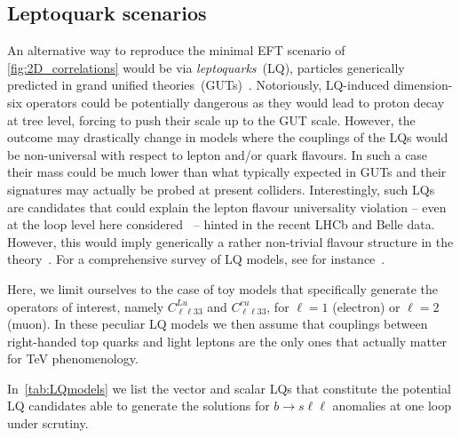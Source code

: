 \subsection{Leptoquark scenarios}
\label{sec:mod_Leptoquarks}
An alternative way to reproduce the minimal EFT scenario of \autoref{fig:2D_correlations} would be via \emph{leptoquarks}~(LQ), particles generically predicted in grand unified  theories~(GUTs)~\cite{Pati:1974yy,PhysRevLett.32.438}.
Notoriously, LQ-induced dimension-six operators could be potentially dangerous as they would lead to proton decay at tree level, forcing to push their scale up to the GUT scale. However, the outcome may drastically change in models where the couplings of the LQs would be non-universal with respect to lepton and/or quark flavours. In such a case their mass could be much lower than what typically expected in GUTs and their signatures may actually be probed at present colliders. Interestingly, such LQs are candidates that could explain the lepton flavour universality violation -- even at the loop level here considered~\cite{Camargo-Molina:2018cwu,Coy:2019rfr} -- hinted in the recent LHCb and Belle data. However, this would imply generically a rather non-trivial flavour structure in the theory~\cite{Becirevic:2017jtw}. For a comprehensive survey of LQ models, see for instance~\cite{Buchmuller:1986zs,delAguila:2010mx,Alonso:2015sja,Dorsner:2016wpm,deBlas:2017xtg}. 

Here, we limit ourselves to the case of toy models that specifically generate the operators of interest, namely $C^{Lu}_{\ell \ell33}$ and $C^{eu}_{\ell \ell33} $, for $ \ell=1$ (electron)  or $ \ell=2$ (muon). In these peculiar LQ models we then assume that couplings between right-handed top quarks and light leptons are the only ones that actually matter for TeV phenomenology. 

In~\autoref{tab:LQmodels} we list the vector and scalar LQs that constitute the potential LQ candidates able to generate the solutions for $b \to s \ell \ell$ anomalies at one loop under scrutiny.  

